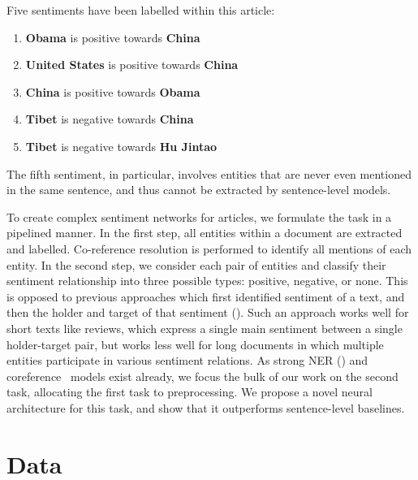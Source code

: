 \documentclass[11pt,a4paper]{article}
\begin{document}
Five sentiments have been labelled within this article:
\begin{enumerate}
\item \textcolor[rgb]{1, 0.5, 0}{\textbf{Obama}} is \textcolor[rgb]{0, 0.5, 0}{positive} towards \textcolor[rgb]{1, 0, 0}{\textbf{China}}
\item \textcolor[rgb]{0, 0, 1}{\textbf{United States}} is \textcolor[rgb]{0, 0.5, 0}{positive} towards \textcolor[rgb]{1, 0, 0}{\textbf{China}}
\item \textcolor[rgb]{1, 0, 0}{\textbf{China}} is \textcolor[rgb]{0, 0.5, 0}{positive} towards \textcolor[rgb]{1, 0.5, 0}{\textbf{Obama}}
\item \textcolor[rgb]{0, 0.5, 0}{\textbf{Tibet}} is \textcolor[rgb]{1, 0, 0}{negative} towards \textcolor[rgb]{1, 0, 0}{\textbf{China}}
\item \textcolor[rgb]{0, 0.5, 0}{\textbf{Tibet}} is \textcolor[rgb]{1, 0, 0}{negative} towards \textcolor[rgb]{0.4, 0.25, 0.13}{\textbf{Hu Jintao}}
\end{enumerate}
The fifth sentiment, in particular, involves entities that are never even mentioned in the same sentence, and thus cannot be extracted by sentence-level models.
\par To create complex sentiment networks for articles, we formulate the task in a pipelined manner.
In the first step, all entities within a document are extracted and labelled.
Co-reference resolution is performed to identify all mentions of each entity.
In the second step, we consider each pair of entities and classify their sentiment relationship into three possible types: positive, negative, or none.
This is opposed to previous approaches which first identified sentiment of a text, and then the holder and target of that sentiment ().
Such an approach works well for short texts like reviews, which express a single main sentiment between a single holder-target pair, but works less well for long documents in which multiple entities participate in various sentiment relations.
As strong NER () and coreference~\cite{Lee:17} models exist already, we focus the bulk of our work on the second task, allocating the first task to preprocessing.
We propose a novel neural architecture for this task, and show that it outperforms sentence-level baselines.

\section{Data}
\end{document}
